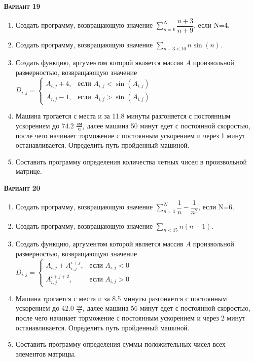 \textsc{\textbf{Вариант 19}}
\begin{enumerate}
\item  Создать программу, возвращающую значение $\sum\limits_{n=0}^{N} \dfrac{n+3}{n+9}              $, если N=4. 
\item  Создать программу, возвращающую значение $\sum\limits_{n-3<      10} {n \sin(n)}                   $. 
\item Создать функцию, аргументом которой является массив $A$ произвольной размерностью, возвращающую значение $D_{i,j}=\begin{cases} A_{i,j}+4, & \text{если } {A_{i,j}}<\sin(A_{i,j}) \\  A_{i,j}-1, & \text{если } {A_{i,j}}>\sin(A_{i,j}) \end{cases}    $ 
\item Машина трогается с места и за 11.8 минуты разгоняется с постоянным ускорением до 74.2 ${\frac{км}{ч}}$, далее машина   50 минут едет с постоянной скоростью, после чего начинает торможение с постоянным ускорением и через   1 минут останавливается. Определить путь пройденный машиной.  \item Составить программу определения количества четных чисел в произвольной матрице.                                                                                                                                                                                                  

\end{enumerate}
\textsc{\textbf{Вариант 20}}
\begin{enumerate}
\item  Создать программу, возвращающую значение $\sum\limits_{n=1}^{N} {\dfrac{1}{n} -\dfrac{1}{n^2}}$, если N=6. 
\item  Создать программу, возвращающую значение $\sum\limits_{n<        15} {n (n-1)}                     $. 
\item Создать функцию, аргументом которой является массив $A$ произвольной размерностью, возвращающую значение $D_{i,j}=\begin{cases} A_{i,j}+A_{i,j}^{i+j}, & \text{если } {A_{i,j}}<0 \\  A_{i,j}^{i+j+2}, & \text{если } {A_{i,j}}>0 \end{cases}          $ 
\item Машина трогается с места и за  8.5 минуты разгоняется с постоянным ускорением до 42.0 ${\frac{км}{ч}}$, далее машина   56 минут едет с постоянной скоростью, после чего начинает торможение с постоянным ускорением и через   2 минут останавливается. Определить путь пройденный машиной.  \item Составить программу определения суммы положительных чисел всех элементов матрицы.                                                                                                                                                                                              

\end{enumerate}
